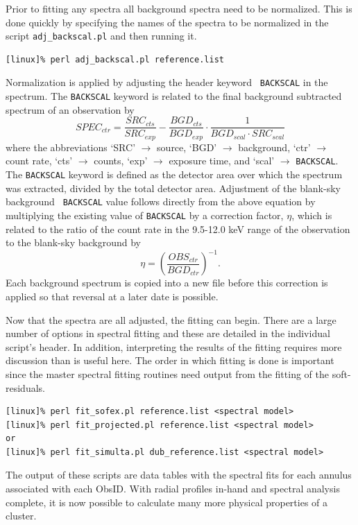Prior to fitting any spectra all background spectra need to be
normalized. This is done quickly by specifying the names of the
spectra to be normalized in the script {\tt{adj\_backscal.pl}} and then
running it.
\begin{verbatim}
[linux]% perl adj_backscal.pl reference.list
\end{verbatim}
Normalization is applied by adjusting the header keyword {\tt
BACKSCAL} in the spectrum. The {\tt BACKSCAL} keyword is related to
the final background subtracted spectrum of an observation by
\begin{equation}
SPEC_{ctr} = \frac{SRC_{cts}}{SRC_{exp}} -
\frac{BGD_{cts}}{BGD_{exp}} \cdot \frac{1}{BGD_{scal} \cdot
SRC_{scal}}
\end{equation}
where the abbreviations `SRC' $\rightarrow$ source, `BGD'
$\rightarrow$ background, `ctr' $\rightarrow$ count rate, `cts'
$\rightarrow$ counts, `exp' $\rightarrow$ exposure time, and `scal'
$\rightarrow$ {\tt BACKSCAL}. The {\tt BACKSCAL} keyword is defined as
the detector area over which the spectrum was extracted, divided by
the total detector area. Adjustment of the blank-sky background {\tt
BACKSCAL} value follows directly from the above equation by
multiplying the existing value of {\tt BACKSCAL} by a correction
factor, $\eta$, which is related to the ratio of the count rate in the
9.5-12.0 keV range of the observation to the blank-sky background by
\begin{equation}
\eta = (\frac{OBS_{ctr}}{BGD_{ctr}})^{-1}.
\end{equation}
Each background spectrum is copied into a new file before this
correction is applied so that reversal at a later date is possible.

Now that the spectra are all adjusted, the fitting can begin. There
are a large number of options in spectral fitting and these are
detailed in the individual script's header. In addition, interpreting
the results of the fitting requires more discussion than is useful
here. The order in which fitting is done is important since the master
spectral fitting routines need output from the fitting of the
soft-residuals.
\begin{verbatim}
[linux]% perl fit_sofex.pl reference.list <spectral model>
[linux]% perl fit_projected.pl reference.list <spectral model>
or
[linux]% perl fit_simulta.pl dub_reference.list <spectral model>
\end{verbatim}
The output of these scripts are data tables with the spectral fits for
each annulus associated with each ObsID. With radial profiles in-hand
and spectral analysis complete, it is now possible to calculate many
more physical properties of a cluster.

